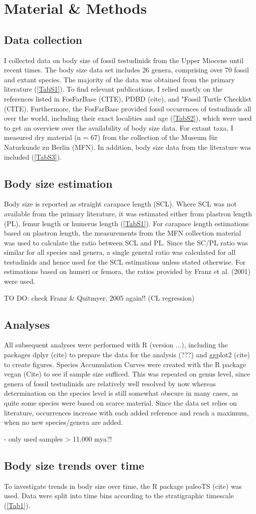 \section{Material \& Methods}

\subsection{Data collection}
I collected data on body size of fossil testudinids from the Upper Miocene until recent times. The body size data set includes 26 genera, comprising over 70 fossil and extant species. The majority of the data was obtained from the primary literature (\ref{TabS1}). To find relevant publications, I relied mostly on the references listed in FosFarBase (CITE), PDBD (cite), and "Fossil Turtle Checklist (CITE).
Furthermore, the FosFarBase provided fossil occurences of testudinids all over the world, including their exact localities and age (\ref{TabS2}), which were used to get an overview over the availability of body size data. 
For extant taxa, I measured dry material (n = 67) from the collection of the Museum für Naturkunde zu Berlin (MFN). In addition, body size data from the literature was included (\ref{TabS3}).

\subsection{Body size estimation}
Body size is reported as straight carapace length (SCL). Where SCL was not available from the primary literature, it was estimated either from plastron length (PL), femur length or humerus length (\ref{TabS1}). For carapace length estimations based on plastron length, the measurements from the MFN collection material was used to calculate the ratio between SCL and PL. Since the SC/PL ratio was similar for all species and genera, a single general ratio was calculated for all testudinids and hence used for the SCL estimations unless stated otherwise. For estimations based on humeri or femora, the ratios provided by Franz et al. (2001) were used.

TO DO: check Franz \& Quitmyer, 2005 again!! (CL regression)

\subsection{Analyses}
All subsequent analyses were performed with R (version ...), including the packages dplyr (cite) to prepare the data for the analysis (???) and ggplot2 (cite) to create figures. Species Accumulation Curves were created with the R package vegan (Cite) to see if sample size sufficed. This was repeated on genus level, since genera of fossil testudinids are relatively well resolved by now whereas determination on the species level is still somewhat obscure in many cases, as quite some species were based on scarce material. Since the data set relies on literature, occurrences increase with each added reference and reach a maximum, when no new species/genera are added.



- only used samples > 11.000 mya?!

\subsection{Body size trends over time}
To investigate trends in body size over time, the R package paleoTS (cite) was used. Data were split into time bins according to the stratigraphic timescale (\ref{Tab1}). 